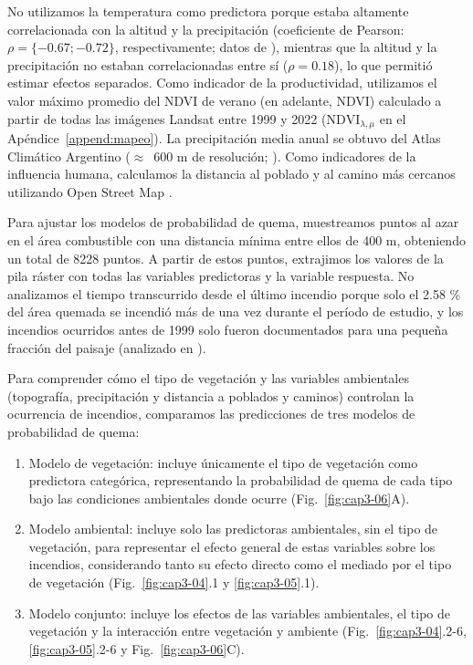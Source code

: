 No utilizamos la temperatura como predictora porque estaba altamente correlacionada con la altitud y la precipitación (coeficiente de Pearson: $\rho = \{−0.67; -0.72\}$, respectivamente; datos de \citealt{bianchi_atlas_2010}), mientras que la altitud y la precipitación no estaban correlacionadas entre sí ($\rho = 0.18$), lo que permitió estimar efectos separados. Como indicador de la productividad, utilizamos el valor máximo promedio del NDVI de verano (en adelante, NDVI) calculado a partir de todas las imágenes Landsat entre 1999 y 2022 ($\text{NDVI}_{\lambda,\mu}$ en el Apéndice~\ref{append:mapeo}). La precipitación media anual se obtuvo del Atlas Climático Argentino ($\approx$~600 m de resolución; \citealt{bianchi_atlas_2010}). Como indicadores de la influencia humana, calculamos la distancia al poblado y al camino más cercanos utilizando Open Street Map \citep{openstreetmap2015}.

Para ajustar los modelos de probabilidad de quema, muestreamos puntos al azar en el área combustible con una distancia mínima entre ellos de 400 m, obteniendo un total de 8228 puntos. A partir de estos puntos, extrajimos los valores de la pila ráster con todas las variables predictoras y la variable respuesta. No analizamos el tiempo transcurrido desde el último incendio porque solo el 2.58 \% del área quemada se incendió más de una vez durante el período de estudio, y los incendios ocurridos antes de 1999 solo fueron documentados para una pequeña fracción del paisaje (analizado en \citealt{tiribelli_non-additive_2019}).

Para comprender cómo el tipo de vegetación y las variables ambientales (topografía, precipitación y distancia a poblados y caminos) controlan la ocurrencia de incendios, comparamos las predicciones de tres modelos de probabilidad de quema:

\begin{enumerate}
    \item Modelo de vegetación: incluye únicamente el tipo de vegetación como predictora categórica, representando la probabilidad de quema de cada tipo bajo las condiciones ambientales donde ocurre (Fig.~\ref{fig:cap3-06}A).
    \item Modelo ambiental: incluye solo las predictoras ambientales, sin el tipo de vegetación, para representar el efecto general de estas variables sobre los incendios, considerando tanto su efecto directo como el mediado por el tipo de vegetación (Fig.~\ref{fig:cap3-04}.1 y \ref{fig:cap3-05}.1).
    \item Modelo conjunto: incluye los efectos de las variables ambientales, el tipo de vegetación y la interacción entre vegetación y ambiente (Fig.~\ref{fig:cap3-04}.2-6, \ref{fig:cap3-05}.2-6 y Fig.~\ref{fig:cap3-06}C).
\end{enumerate}
    
